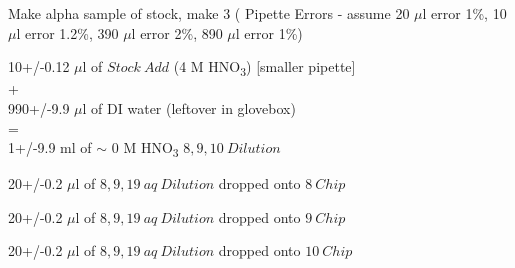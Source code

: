 \documentclass[idxtotoc,hyperref,openany,oneside]{labbook} %
\newcommand{\cmark}{\ding{51}}%
\newcommand{\done}{\rlap{$\square$}{\raisebox{2pt}{\large\hspace{1pt}\cmark}}%
  \hspace{-2.5pt}}
\newcommand{\tsbs}{\textsubscript}
\begin{document}

\begin{todolist}
  
\item[\done]{Make alpha sample of stock, make 3 (
      Pipette Errors - assume 20 $\mu$l error 1\%,
      10 $\mu$l error 1.2\%, 390 $\mu$l error 2\%, 890 $\mu$l error 1\%)}
\end{todolist}
\begin{center}
  10+/-0.12 $\mu$l of $\boxed{Stock\ Add}$ (4 M HNO\tsbs{3})
  [smaller pipette]\\
+\\
990+/-9.9 $\mu$l of DI water (leftover in glovebox)\\
=\\
1+/-9.9 ml of $\sim$ 0 M HNO\tsbs{3} $\boxed{8,9,10\ Dilution}$
\end{center}
\vspace{0.3cm}
\begin{center}
  20+/-0.2 $\mu$l of $\boxed{8,9,19\ aq\ Dilution}$ dropped onto
  $\boxed{8\ Chip}$
\end{center}
\begin{center}
  20+/-0.2 $\mu$l of $\boxed{8,9,19\ aq\ Dilution}$ dropped onto
  $\boxed{9\ Chip}$
\end{center}
\begin{center}
  20+/-0.2 $\mu$l of $\boxed{8,9,19\ aq\ Dilution}$ dropped onto
  $\boxed{10\ Chip}$
\end{center}
\end{document}
